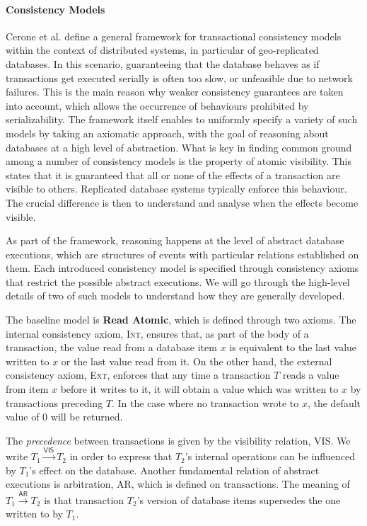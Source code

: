 \paragraph{Consistency Models} Cerone et al. \cite{ceroneConcur15} define a general framework for transactional consistency models within the context of distributed systems, in particular of geo-replicated databases. In this scenario, guaranteeing that the database behaves as if transactions get executed serially is often too slow, or unfeasible due to network failures. This is the main reason why weaker consistency guarantees are taken into account, which allows the occurrence of behaviours prohibited by serializability. The framework itself enables to uniformly specify a variety of such models by taking an axiomatic approach, with the goal of reasoning about databases at a high level of abstraction. What is key in finding common ground among a number of consistency models is the property of atomic visibility. This states that it is guaranteed that all or none of the effects of a transaction are visible to others. Replicated database systems typically enforce this behaviour. The crucial difference is then to understand and analyse when the effects become visible.

As part of the framework, reasoning happens at the level of abstract database executions, which are structures of events with particular relations established on them. Each introduced consistency model is specified through consistency axioms that restrict the possible abstract executions. We will go through the high-level details of two of such models to understand how they are generally developed.

The baseline model is \textbf{Read Atomic}, which is defined through two axioms. The internal consistency axiom, \textsc{Int}, ensures that, as part of the body of a transaction, the value read from a database item $x$ is equivalent to the last value written to $x$ or the last value read from it. On the other hand, the external consistency axiom, \textsc{Ext}, enforces that any time a transaction $T$ reads a value from item $x$ before it writes to it, it will obtain a value which was written to $x$ by transactions preceding $T$. In the case where no transaction wrote to $x$, the default value of $0$ will be returned.

The \textit{precedence} between transactions is given by the visibility relation, \textsf{VIS}. We write $T_1 \xrightarrow{\mathsf{VIS}} T_2$ in order to express that $T_2$'s internal operations can be influenced by $T_1$'s effect on the database. Another fundamental relation of abstract executions is arbitration, \textsf{AR}, which is defined on transactions. The meaning of $T_1 \xrightarrow{\mathsf{AR}} T_2$ is that transaction $T_2$'s version of database items supersedes the one written to by $T_1$.

